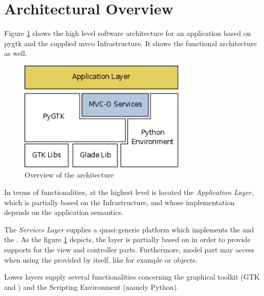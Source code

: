 \section{\label{ARCH} Architectural Overview}

Figure \ref{HLA_f} shows the high level software architecture for an
application based on pygtk and the supplied {mvco} Infrastructure. It
shows the functional architecture as well.

\begin{figure}[htbp]
\begin{center}
\includegraphics[width=8cm]{figs/png/arch}
\caption{\label{HLA_f}Overview of the architecture}
\end{center}
\end{figure}



In terms of functionalities, at the highest level is located the
\emph{Application Layer}, which is partially based on the \mvco
Infrastructure, and whose implementation depends on the application
semantics.

The \emph{\mvco Services Layer} supplies a quasi-generic platform
which implements the \mvc and the \obs. As the figure \ref{HLA_f}
depicts, the \mvco layer is partially based on \pygtk in order to
provide supports for the view and controller parts. Furthermore, model
part may access \pygtk when using the \mvc provided by \pygtk itself,
like for example  or 
objects.

Lower layers supply several functionalities concerning the graphical
toolkit (GTK and \glade) and the Scripting Environment (namely
Python).




